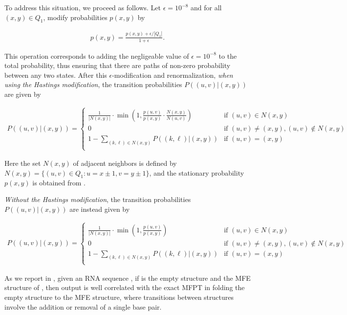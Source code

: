 \documentclass[11pt, oneside]{Thesis} %
\begin{document}
To address this situation, we proceed as follows. Let $\epsilon =
10^{-8}$ and for all $(x,y) \in Q_1$, modify probabilities $p(x,y)$ by

\begin{align}
\label{eq:hermes:mfptNormalize} p(x,y) = \frac{p(x,y) +
\epsilon/|Q_1|}{1+\epsilon }.
\end{align}

This operation corresponds to adding the negligeable value of
$\epsilon=10^{-8}$ to the total probability, thus ensuring that there
are paths of non-zero probability between any two states. After this
$\epsilon$-modification and renormalization, {\em when using the
Hastings modification}, the transition probabilities $P((u,v)|(x,y))$
are given by

\begin{align}
\label{eq:hermes:xitionProbFfttwoWithHastings}
P((u,v)|(x,y))=
\begin{cases}
\frac{1}{|N(x,y)|} \cdot \min\left(1, \frac{p(u,v)}{p(x,y)} \cdot
\frac{N(x,y)}{N(u,v)}\right) & \text{if $(u,v) \in N(x,y)$} \\
0 &\text{if $(u,v) \ne (x,y), (u,v) \not\in N(x,y)$} \\
1 - \sum_{(k,\ell) \in N(x,y)} P((k,\ell)|(x,y)) & \text{if $(u,v)=(x,y)$} \\
\end{cases}
\end{align}

Here the set $N(x,y)$ of adjacent neighbors is defined by $N(x,y) = \{
(u,v) \in Q_1 : u = x \pm 1, v = y \pm 1 \}$, and the stationary
probability $p(x,y)$ is obtained from \ffttwo.

{\em Without the Hastings modification}, the transition probabilities
$P((u,v)|(x,y))$ are instead given by

\begin{align}
\label{eq:hermes:xitionProbFfttwoWithoutHastings}
P((u,v)|(x,y))=
\begin{cases}
\frac{1}{|N(x,y)|} \cdot \min\left(1, \frac{p(u,v)}{p(x,y)}\right)
& \text{if $(u,v) \in N(x,y)$} \\
0 &\text{if $(u,v) \ne (x,y), (u,v) \not\in N(x,y)$} \\
1 - \sum_{(k,\ell) \in N(x,y)} P((k,\ell)|(x,y)) & \text{if $(u,v)=(x,y)$} \\
\end{cases}
\end{align}

As we report in ,
given an RNA
sequence \seq, if \strA is the empty structure and \strB the MFE
structure of \seq, then \fftmfpt output is well correlated with the
exact MFPT in folding the empty structure to the MFE structure, where
transitions between structures involve the addition or removal of a
single base pair.
\end{document}

